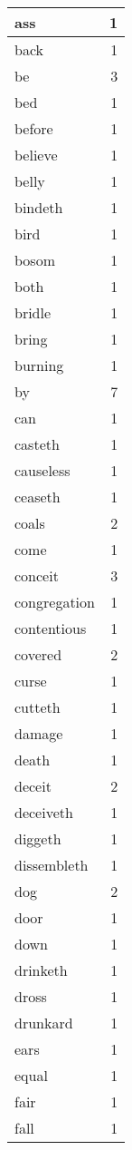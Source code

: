 \begin{center}
\begin{longtable}{l|r}
ass & 1\\ \hline 
back & 1\\ \hline 
be & 3\\ \hline 
bed & 1\\ \hline 
before & 1\\ \hline 
believe & 1\\ \hline 
belly & 1\\ \hline 
bindeth & 1\\ \hline 
bird & 1\\ \hline 
bosom & 1\\ \hline 
both & 1\\ \hline 
bridle & 1\\ \hline 
bring & 1\\ \hline 
burning & 1\\ \hline 
by & 7\\ \hline 
can & 1\\ \hline 
casteth & 1\\ \hline 
causeless & 1\\ \hline 
ceaseth & 1\\ \hline 
coals & 2\\ \hline 
come & 1\\ \hline 
conceit & 3\\ \hline 
congregation & 1\\ \hline 
contentious & 1\\ \hline 
covered & 2\\ \hline 
curse & 1\\ \hline 
cutteth & 1\\ \hline 
damage & 1\\ \hline 
death & 1\\ \hline 
deceit & 2\\ \hline 
deceiveth & 1\\ \hline 
diggeth & 1\\ \hline 
dissembleth & 1\\ \hline 
dog & 2\\ \hline 
door & 1\\ \hline 
down & 1\\ \hline 
drinketh & 1\\ \hline 
dross & 1\\ \hline 
drunkard & 1\\ \hline 
ears & 1\\ \hline 
equal & 1\\ \hline 
fair & 1\\ \hline 
fall & 1\\ \hline 

\end{longtable}
\end{center}
